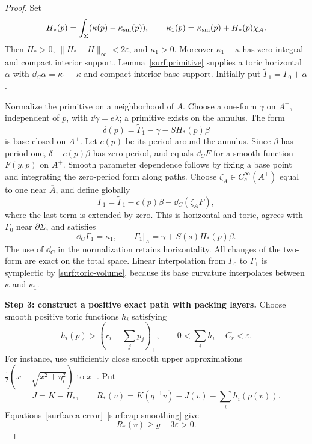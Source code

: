 \begin{proof}
Set
\begin{equation}\label{surf:H-star}
 H_*(p)=\int_\Sigma(\kappa(p)-\kappa_{\rm sm}(p)),\qquad
 \kappa_1(p)=\kappa_{\rm sm}(p)+H_*(p)\chi_A.
\end{equation}
Then $H_*>0$, $\|H_*-H\|_\infty<2\varepsilon$, and
$\kappa_1>0$.  Moreover $\kappa_1-\kappa$ has zero integral
and compact interior support.  Lemma~\ref{surf:primitive} supplies
a toric horizontal $\alpha$ with
$\dd_C\alpha=\kappa_1-\kappa$ and compact interior base support.
Initially put $\widetilde\Gamma_1=\Gamma_0+\alpha$.

Normalize the primitive on a neighborhood of $\overline A$.
Choose a one-form $\gamma$ on $A^+$, independent of $p$, with
$\dd\gamma=e\lambda$; a primitive exists on the annulus.
The form
\[
 \delta(p)=\widetilde\Gamma_1-\gamma-SH_*(p)\beta
\]
is base-closed on $A^+$.  Let $c(p)$ be its period around the
annulus.  Since $\beta$ has period one, $\delta-c(p)\beta$ has
zero period, and equals $\dd_C F$ for a smooth function $F(y,p)$
on $A^+$.  Smooth parameter dependence follows by fixing a base
point and integrating the zero-period form along paths.
Choose $\zeta_A\in C_c^\infty(A^+)$ equal to one near $\overline A$,
and define globally
\[
 \Gamma_1=\widetilde\Gamma_1-c(p)\beta-\dd_C(\zeta_AF),
\]
where the last term is extended by zero.  This is horizontal and
toric, agrees with $\Gamma_0$ near $\partial\Sigma$, and satisfies
\begin{equation}\label{surf:annular-normal-form}
 \dd_C\Gamma_1=\kappa_1,\qquad
 \Gamma_1|_A=\gamma+S(s)H_*(p)\beta .
\end{equation}
The use of $\dd_C$ in the normalization retains horizontality.
All changes of the two-form are exact on the total space.
Linear interpolation from $\Gamma_0$ to $\Gamma_1$ is symplectic
by \eqref{surf:toric-volume}, because its base curvature interpolates
between $\kappa$ and $\kappa_1$.

\medskip\noindent
\textbf{Step 3: construct a positive exact path with packing layers.}
Choose smooth positive toric functions $h_i$ satisfying
\begin{equation}\label{surf:cap-smoothing}
 h_i(p)>(r_i-\textstyle\sum_jp_j)_+,\qquad
 0<\sum_i h_i-C_r<\varepsilon.
\end{equation}
For instance, use sufficiently close smooth upper approximations
$\frac12(x+\sqrt{x^2+\eta_i^2})$ to $x_+$.
Put
\[
 J=K-H_*,\qquad
 R_*(v)=K(q^{-1}v)-J(v)-\sum_i h_i(p(v)).
\]
Equations~\eqref{surf:area-error}--\eqref{surf:cap-smoothing} give
\begin{equation}\label{surf:residual-gap}
                       R_*(v)\geq g-3\varepsilon>0.
\end{equation}


\end{proof}
